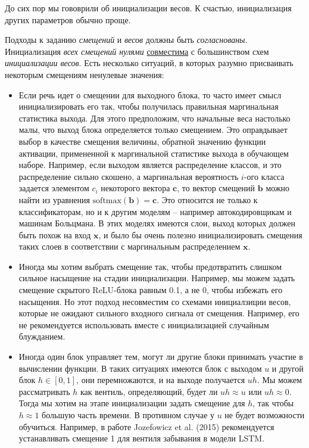 \documentclass[%
	11pt,
	a4paper,
	utf8,
]{article}
\begin{document}
До сих пор мы гововрили об инициализации весов. К счастью, инициализация других параметров обычно проще.

Подходы к заданию \emph{смещений} и \emph{весов} должны быть \emph{согласнованы}. Инициализация \emph{всех смещений нулями} \underline{совместима} с большинством схем \emph{инициализации весов}. Есть несколько ситуаций, в которых разумно присваивать некоторым смещениям ненулевые значения:
\begin{itemize}
	\item Если речь идет о смещении для выходного блока, то часто имеет смысл инициализировать его так, чтобы получилась правильная маргинальная статистика выхода. Для этого предположим, что начальные веса настолько малы, что выход блока определяется только смещением. Это оправдывает выбор в качестве смещения величины, обратной значению функции активации, примененной к маргинальной статистике выхода в обучающем наборе. Например, если выходом является распределение классов, и это распределение сильно скошено, а маргинальная вероятность $ i $-ого класса задается элементом $ c_i $ некоторого вектора $ \mathbf{c} $, то вектор смещений $ \mathbf{b} $ можно найти из уравнения $ \text{softmax}(\mathbf{b}) = \mathbf{c} $. Это относится не только к классификаторам, но и к другим моделям -- например автокодировщикам и машинам Больцмана. В этих моделях имеются слои, выход которых должен быть похож на вход $ \mathbf{x} $, и было бы очень полезно инициализировать смещения таких слоев в соответствии с маргинальным распределением $ \mathbf{x} $.
	
	\item Иногда мы хотим выбрать смещение так, чтобы предотвратить слишком сильное насыщение на стадии инициализации. Например, мы можем задать смещение скрытого ReLU-блока равным 0.1, а не 0, чтобы избежать его насыщения. Но этот подход несовместим со схемами инициалзиции весов, которые не ожидают сильного входного сигнала от смещения. Например, его не рекомендуется использовать вместе с инициализацией случайным блужданием.
	
	\item Иногда один блок управляет тем, могут ли другие блоки принимать участие в вычислении функции. В таких ситуациях имеются блок с выходом $ u $ и другой блок $ h \in [0, 1] $, они перемножаются, и на выходе получается $ u h $. Мы можем рассматривать $ h $ как вентиль, определяющий, будет ли $ u h \approx u $ или $ u h \approx 0 $. Тогда мы хотим на этапе инициализации задать смещение для $ h $, так чтобы $ h \approx 1 $ большую часть времени. В противном случае у $ u $ не будет возможности обучиться. Например, в работе Jozefowicz et al. (2015) рекомендуется устанавливать смещение 1 для вентиля забывания в модели LSTM.
\end{itemize}
\end{document}
